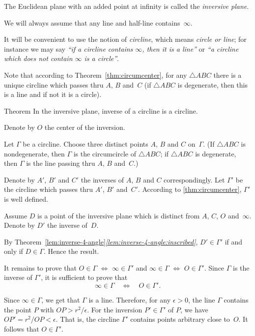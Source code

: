 The Euclidean plane with an added point at infinity is called the \emph{inversive plane}.

We will always assume that any line and half-line contains~$\infty$. 

It will be convenient to use the notion of 
\emph{circline},
which means {}\emph{circle or line};
for instance we may say 
{}\emph{``if a circline contains $\infty$, then it is a line''} or {}\emph{``a circline which does not contain $\infty$  is a circle''}.

Note that according to Theorem~\ref{thm:circumcenter}, 
for any $\triangle ABC$ there is a unique circline which passes thru $A$, $B$ and~$C$
(if $\triangle ABC$ is degenerate, then this is a line and if not it is a circle).



\begin{thm}{Theorem}\label{thm:inverse-cline}
In the inversive plane, inverse of a circline is a circline.
\end{thm}

Denote by $O$ the center of the inversion.

Let $\Gamma$ be a circline.
Choose three distinct points $A$, $B$ and $C$ on~$\Gamma$.
(If $\triangle ABC$ is nondegenerate, 
then $\Gamma$ is the circumcircle of $\triangle ABC$;
if $\triangle ABC$ is degenerate, 
then $\Gamma$ is the line passing thru $A$, $B$ and~$C$.)

Denote by $A'$, $B'$ and $C'$ the inverses of $A$, $B$ and $C$ correspondingly.
Let $\Gamma'$ be the circline which passes thru $A'$, $B'$ and~$C'$.
According to \ref{thm:circumcenter}, $\Gamma'$ is well defined.

Assume $D$ is a point of the inversive plane which is distinct from $A$, $C$, $O$ and~$\infty$.
Denote by $D'$ the inverse of~$D$.

By Theorem~\ref{lem:inverse-4-angle}\textit{\ref{lem:inverse-4-angle:inscribed}},
$D'\in\Gamma'$ if and only if $D\in\Gamma$.
Hence the result.

It remains to prove that 
$O\in \Gamma$ $\Leftrightarrow$ $\infty\in\Gamma'$ 
and 
$\infty\in \Gamma$ $\Leftrightarrow$ $O\in\Gamma'$.
Since $\Gamma$ is the inverse of $\Gamma'$, it is sufficient to prove that 
$$\infty\in \Gamma
\quad
\iff
\quad
O\in\Gamma'.$$

Since $\infty\in\Gamma$, we get that $\Gamma$ is a line.
Therefore, for any $\epsilon>0$, the line $\Gamma$ contains the point $P$ with  $OP>r^2/\epsilon$.
For the inversion $P'\in\Gamma'$ of $P$, we have $OP'=r^2/OP<\epsilon$.
That is, the circline $\Gamma'$ contains points arbitrary close to~$O$.
It follows that $O\in \Gamma'$.
\qeds


